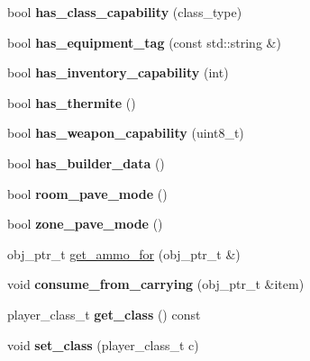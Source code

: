 \begin{DoxyCompactItemize}
bool {\bfseries has\+\_\+class\+\_\+capability} (class\+\_\+type)
\item 
\mbox{\label{classmods_1_1player_a9685c8a6c64a4ebc5020d7acdc5998ca}} 
bool {\bfseries has\+\_\+equipment\+\_\+tag} (const std\+::string \&)
\item 
\mbox{\label{classmods_1_1player_a388ff716cb50f09aac0748bb96a42b6d}} 
bool {\bfseries has\+\_\+inventory\+\_\+capability} (int)
\item 
\mbox{\label{classmods_1_1player_a7aa761f41a093581ba531b2aca325609}} 
bool {\bfseries has\+\_\+thermite} ()
\item 
\mbox{\label{classmods_1_1player_a3b7e1b89793257636a2b34905bf1ec87}} 
bool {\bfseries has\+\_\+weapon\+\_\+capability} (uint8\+\_\+t)
\item 
\mbox{\label{classmods_1_1player_a820086915f10495e365413a391f331d4}} 
bool {\bfseries has\+\_\+builder\+\_\+data} ()
\item 
\mbox{\label{classmods_1_1player_ac44c2d6cab0cfd2bcce014339b2972a6}} 
bool {\bfseries room\+\_\+pave\+\_\+mode} ()
\item 
\mbox{\label{classmods_1_1player_ada7986bb6604aeacaac9d1f22e32c66e}} 
bool {\bfseries zone\+\_\+pave\+\_\+mode} ()
\item 
obj\+\_\+ptr\+\_\+t \hyperlink{classmods_1_1player_a0f650360e3abd409657d69aece464f9b}{get\+\_\+ammo\+\_\+for} (obj\+\_\+ptr\+\_\+t \&)
\item 
\mbox{\label{classmods_1_1player_adf65b2ac8d627710b5e22232b90388f0}} 
void {\bfseries consume\+\_\+from\+\_\+carrying} (obj\+\_\+ptr\+\_\+t \&item)
\item 
\mbox{\label{classmods_1_1player_a048c0e70991f8a290cfda61d754b46f8}} 
player\+\_\+class\+\_\+t {\bfseries get\+\_\+class} () const
\item 
\mbox{\label{classmods_1_1player_a16948903572ee0b751746ea39e4a219e}} 
void {\bfseries set\+\_\+class} (player\+\_\+class\+\_\+t c)

\end{DoxyCompactItemize}
